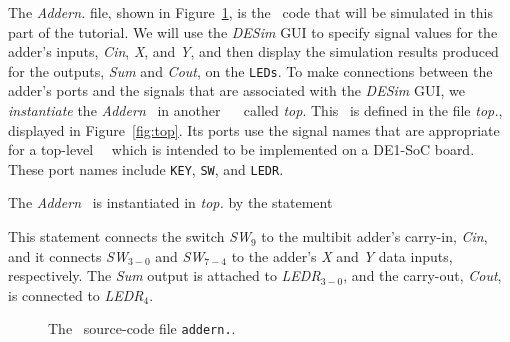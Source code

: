 The {\it Addern.\hdlFileExt} file, shown in Figure~\ref{fig:addern}, is the \hdlName~code that will 
be simulated in this part of the tutorial. We will use the {\it DESim} GUI to specify signal 
values for the adder's inputs, {\it Cin}, {\it X}, and {\it Y}, and then display the
simulation results produced for the outputs, {\it Sum} and {\it Cout}, on the \texttt{LEDs}. 
To make connections between the adder's ports and the signals that are associated with the
{\it DESim} GUI, we {\it instantiate} the {\it Addern} \hdlModuleName~in another \hdlName~\hdlModuleName~
called {\it top}. This \hdlModuleName~is defined in the file {\it top.\hdlFileExt}, displayed in 
Figure~\ref{fig:top}. Its ports use the signal names that are appropriate for a
top-level \hdlName~\hdlModuleName~which is intended to be implemented on a DE1-SoC board. These
port names include \texttt{KEY}, \texttt{SW}, and  \texttt{LEDR}.

The {\it Addern} \hdlModuleName~is instantiated in {\it top.\hdlFileExt} by the statement
	{}
	{}

This statement connects the switch {\it SW}$_9$ to the multibit adder's carry-in, {\it Cin}, 
and it connects {\it SW}$_{3-0}$ and  {\it SW}$_{7-4}$ to the adder's {\it X} and {\it Y} 
data inputs, respectively.  The {\it Sum} output is attached to {\it LEDR}$_{3-0}$, and 
the carry-out, {\it Cout}, is connected to {\it LEDR}$_4$.

\begin{figure}[h]
\begin{center}
\begin{minipage}[h]{15 cm}
	{}
	{}
\end{minipage}
	\caption{The \hdlName~source-code file \texttt{addern.\hdlFileExt}.}
	\label{fig:addern}
\end{center}
\end{figure}

